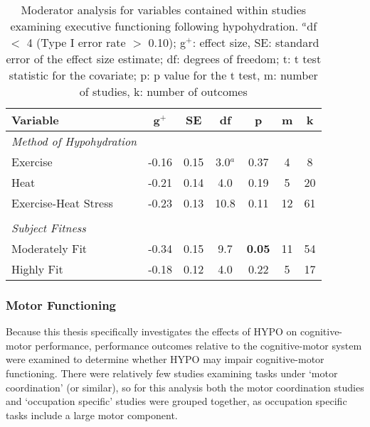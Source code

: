 \begin{table}
	\caption{Moderator analysis for variables contained within studies examining executive functioning following hypohydration. ${^a}$df ${<}$ 4 (Type I error rate ${>}$ 0.10); g${^+}$: effect size, SE: standard error of the effect size estimate; df: degrees of freedom; t: t test statistic for the covariate; p: p value for the t test, m: number of studies, k: number of outcomes}
	\centering
	\begin{tabular}{lcccccc} 
		\hline
		\textbf{Variable} & \textbf{g${^+}$} & \textbf{SE} & \textbf{df} & \textbf{p} & \textbf{m} & 
		\textbf{k} \\
		\hline
		\textit{Method of Hypohydration} &&&&&& \\
		Exercise & -0.16 & 0.15 & 3.0${^a}$ & 0.37 & 4 & 8 \\
		Heat & -0.21 & 0.14 & 4.0 & 0.19 & 5 & 20 \\ 
		Exercise-Heat Stress & -0.23 & 0.13 & 10.8 & 0.11 & 12 & 61 \\
		&&&&&& \\
		\textit{Subject Fitness} &&&&&& \\
		Moderately Fit & -0.34 & 0.15 & 9.7 & \textbf{0.05} & 11 & 54 \\
		Highly Fit & -0.18 & 0.12 & 4.0 & 0.22 & 5 & 17 \\
		\hline		    
	\end{tabular}
	\label{tbl:ex_func_moderators}
\end{table}

\subsubsection{Motor Functioning}
Because this thesis specifically investigates the effects of HYPO on cognitive-motor performance, performance outcomes relative to the cognitive-motor system were examined to determine whether HYPO may impair cognitive-motor functioning. There were relatively few studies examining tasks under `motor coordination' (or similar), so for this analysis both the motor coordination studies and `occupation specific' studies were grouped together, as occupation specific tasks include a large motor component.

